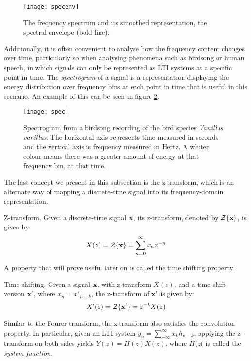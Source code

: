 \documentclass[../main.tex]{subfiles}
\begin{document}
\begin{figure}[t]
\centering
\texttt{[image: specenv]}
\caption{The frequency spectrum and its smoothed representation, the spectral envelope (bold line).}
\label{fig_specenv}
\end{figure}
\par Additionally, it is often convenient to analyse how the frequency content changes over time, particularly so when analysing phenomena such as birdsong or human speech, in which signals can only be represented as LTI systems at a specific point in time. The \emph{spectrogram} of a signal is a representation displaying the energy distribution over frequency bins at each point in time that is useful in this scenario. An example of this can be seen in figure \ref{fig_spec}.
\begin{figure}[t]
\centering
\texttt{[image: spec]}
\caption{Spectrogram from a birdsong recording of the bird species \emph{Vanillus vanillus}. The horizontal axis represents time measured in seconds and the vertical axis is frequency measured in Hertz. A whiter colour means there was a greater amount of energy at that frequency bin, at that time.}
\label{fig_spec}
\end{figure}
\par The last concept we present in this subsection is the z-transform, which is an alternate way of mapping a discrete-time signal into its frequency-domain representation. 
\begin{definition}{Z-transform.} \label{def_ztransform}
Given a discrete-time signal $\mathbf{x}$, its z-transform, denoted by $\mathcal{Z}\{\mathbf{x}\}$, is given by:
\begin{align*}
X(z) = \mathcal{Z}\{\mathbf{x}\} = \sum_{n=0}^\infty{x_nz^{-n}}
\end{align*}
\end{definition}
\par A property that will prove useful later on is called the time shifting property:
\begin{definition}{Time-shifting.} \label{def_timeshitfing}
Given a signal $\mathbf{x}$, with z-transform $X(z)$, and a time shift-version $\mathbf{x}'$, where $x_n = x'_{n-k}$, the z-transform of $\mathbf{x}'$ is given by:
\begin{align*}
X'(z) = \mathcal{Z}\{\mathbf{x}'\} = z^{-k}X(z)
\end{align*}
\end{definition}
\par Similar to the Fourer transform, the z-transform also satisfies the convolution property. In particular, given an LTI system $y_n = \sum_{-\infty}^\infty{x_kh_{n-k}}$, applying the z-transform on both sides yields $Y(z) = H(z)X(z)$, where $H(z($ is called the \emph{system function}.
\end{document}
